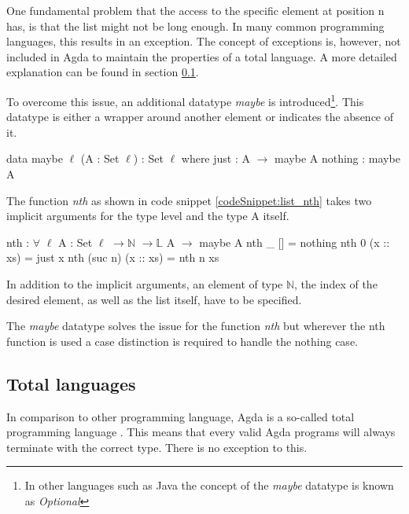 One fundamental problem that the access to the specific element at position n has, is that the list might not be long enough.
In many common programming languages, this results in an exception. The concept of exceptions is, however, not included in Agda to maintain the properties of a total language.
A more detailed explanation can be found in section \ref{section:total_languages}.

To overcome this issue, an additional datatype \emph{maybe} is introduced\footnote{In other languages such as Java the concept of the \emph{maybe} datatype is known as \emph{Optional}}.
This datatype is either a wrapper around another element or indicates the absence of it.

\begin{codesnippet}[mathescape=true, caption={Definition of the maybe datatype in Agda}, label={codeSnippet:maybe_datatype}]
data maybe {$\ell$} (A : Set $\ell$) : Set $\ell$ where
  just : A $\rightarrow$ maybe A
  nothing : maybe A
\end{codesnippet}

The function \emph{nth} as shown in code snippet \ref{codeSnippet:list_nth} takes two implicit arguments for the type level and the type A itself.

\begin{codesnippet}[mathescape=true, caption={Definition of nth function in Agda}, label={codeSnippet:list_nth}]
nth : $\forall$ {$\ell$} {A : Set $\ell$} $\rightarrow \mathbb{N}$ $\rightarrow \mathbb{L}$ A $\rightarrow$ maybe A
nth _ [] = nothing
nth 0 (x :: xs) = just x
nth (suc n) (x :: xs) = nth n xs
\end{codesnippet}

In addition to the implicit arguments, an element of type $\mathbb{N}$, the index of the desired element, as well as the list itself, have to be specified.

The \emph{maybe} datatype solves the issue for the function \emph{nth} but wherever the nth function is used a case distinction is required to handle the nothing case.

\subsection{Total languages}\label{section:total_languages}
In comparison to other programming language, Agda is a so-called total programming language \cite{AgdaReadTheDocs}.
This means that every valid Agda programs will always terminate with the correct type. There is no exception to this.

